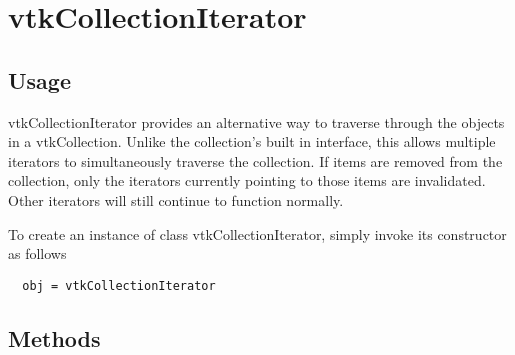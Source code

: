 \section{vtkCollectionIterator}

\subsection{Usage}

 vtkCollectionIterator provides an alternative way to traverse
 through the objects in a vtkCollection.  Unlike the collection's
 built in interface, this allows multiple iterators to
 simultaneously traverse the collection.  If items are removed from
 the collection, only the iterators currently pointing to those
 items are invalidated.  Other iterators will still continue to
 function normally.

To create an instance of class vtkCollectionIterator, simply
invoke its constructor as follows
\begin{verbatim}
  obj = vtkCollectionIterator
\end{verbatim}
\subsection{Methods}

